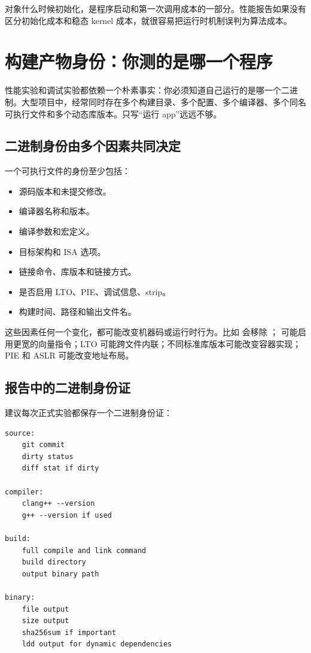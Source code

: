 \begin{warningbox}
对象什么时候初始化，是程序启动和第一次调用成本的一部分。性能报告如果没有区分初始化成本和稳态 kernel 成本，就很容易把运行时机制误判为算法成本。
\end{warningbox}

\section{构建产物身份：你测的是哪一个程序}

性能实验和调试实验都依赖一个朴素事实：你必须知道自己运行的是哪一个二进制。大型项目中，经常同时存在多个构建目录、多个配置、多个编译器、多个同名可执行文件和多个动态库版本。只写“运行 app”远远不够。

\subsection{二进制身份由多个因素共同决定}

一个可执行文件的身份至少包括：

\begin{itemize}
  \item 源码版本和未提交修改。
  \item 编译器名称和版本。
  \item 编译参数和宏定义。
  \item 目标架构和 ISA 选项。
  \item 链接命令、库版本和链接方式。
  \item 是否启用 LTO、PIE、调试信息、strip。
  \item 构建时间、路径和输出文件名。
\end{itemize}

这些因素任何一个变化，都可能改变机器码或运行时行为。比如  会移除 ； 可能启用更宽的向量指令；LTO 可能跨文件内联；不同标准库版本可能改变容器实现；PIE 和 ASLR 可能改变地址布局。

\subsection{报告中的二进制身份证}

建议每次正式实验都保存一个二进制身份证：

\begin{lstlisting}
source:
    git commit
    dirty status
    diff stat if dirty

compiler:
    clang++ --version
    g++ --version if used

build:
    full compile and link command
    build directory
    output binary path

binary:
    file output
    size output
    sha256sum if important
    ldd output for dynamic dependencies
\end{lstlisting}

